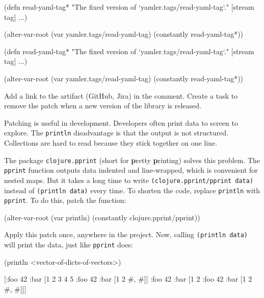 \ifx\DEVICETYPE\MOBILE

\begin{clojure}
(defn read-yaml-tag*
  "The fixed version of
  `yamler.tags/read-yaml-tag`."
  [stream tag]
  ...)

(alter-var-root
 (var yamler.tags/read-yaml-tag)
 (constantly read-yaml-tag*))
\end{clojure}

\else

\begin{clojure}
(defn read-yaml-tag*
  "The fixed version of `yamler.tags/read-yaml-tag`."
  [stream tag]
  ...)

(alter-var-root
 (var yamler.tags/read-yaml-tag)
 (constantly read-yaml-tag*))
\end{clojure}

\fi

Add a link to the artifact (GitHub, Jira) in the comment.
Create a task to remove the patch when a new version of the library is released.

Patching is useful in development.
Developers often print data to screen to explore.
The \verb|println| disadvantage is that the output is not structured.
Collections are hard to read because they stick together on one line.


The package \verb|clojure.pprint| (short for \textbf{p}retty \textbf{p}rinting) solves this problem. The \verb|pprint| function outputs data indented and line-wrapped, which is convenient for nested maps.
But it takes a long time to write \verb|(clojure.pprint/pprint data)| instead of \verb|(println data)| every time. To shorten the code, replace \verb|println| with \verb|pprint|.
To do this, patch the function:

\begin{clojure}
(alter-var-root
 (var println)
 (constantly clojure.pprint/pprint))
\end{clojure}

Apply this patch once, anywhere in the project.
Now, calling \verb|(println data)| will print the data, just like \verb|pprint| does:

\ifx\DEVICETYPE\MOBILE

\begin{clojure}
(println <vector-of-dicts-of-vectors>)

[{:foo 42
  :bar [1 2 3 4 5 {:foo 42
                   :bar [1 2 {#, #}]}]}
 {:foo 42
  :bar [1 2 {:foo 42
             :bar [1 2 {#, #}]}]}]
\end{clojure}

